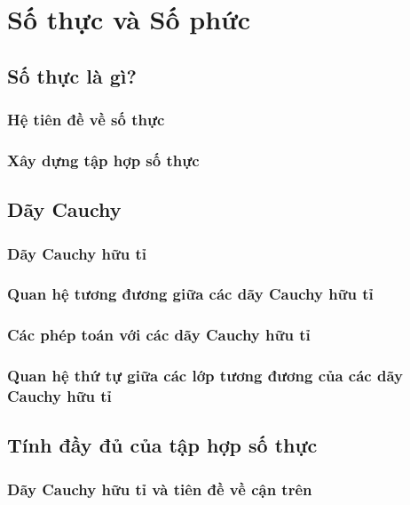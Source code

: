 \chapter{Số thực và Số phức}\label{chapter5:real-numbers-and-complex-numbers}

\section{Số thực là gì?}

\subsection*{Hệ tiên đề về số thực}

\subsection*{Xây dựng tập hợp số thực}

\section{Dãy Cauchy}

\subsection*{Dãy Cauchy hữu tỉ}

\subsection*{Quan hệ tương đương giữa các dãy Cauchy hữu tỉ}

\subsection*{Các phép toán với các dãy Cauchy hữu tỉ}

\subsection*{Quan hệ thứ tự giữa các lớp tương đương của các dãy Cauchy hữu tỉ}

\section{Tính đầy đủ của tập hợp số thực}

\subsection*{Dãy Cauchy hữu tỉ và tiên đề về cận trên}

